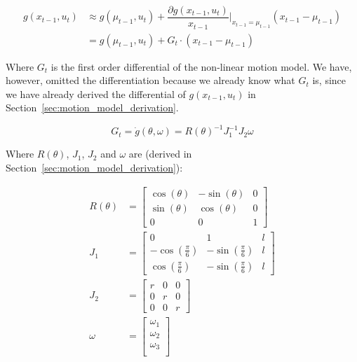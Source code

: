 \documentclass{article}
\begin{document}
\begin{align}
	g(x_{t-1}, u_{t}) 
	& \approx 	
		g(\mu_{t - 1}, u_{t}) 
			+ \dfrac{\partial g(x_{t-1}, u_{t})}{x_{t - 1}} 
				\bigg|_{x_{t - 1} = \mu_{t - 1}}
			(x_{t - 1} - \mu_{t - 1}) \\
	& = g(\mu_{t - 1}, u_{t}) + G_{t} \cdot (x_{t - 1} - \mu_{t - 1})
\end{align}

Where $G_{t}$ is the first order differential of the non-linear motion model. 
We have, however, omitted the differentiation because we already know what 
$G_{t}$ is, since we have already derived the differential of $g(x_{t-1}, 
u_{t})$ in Section~\ref{sec:motion_model_derivation}.

\begin{equation}
	G_{t} = \dot{g}(\theta, \omega) = R(\theta)^{-1} J_{1}^{-1} J_{2} \omega
\end{equation}

Where $R(\theta)$, $J_{1}$, $J_{2}$ and $\omega$ are (derived in 
Section~\ref{sec:motion_model_derivation}): 

\begin{align}
	R(\theta) &= 
 	\begin{bmatrix}
	    \cos{(\theta)} & -\sin{(\theta)} & 0 \\
	    \sin{(\theta)} & \cos{(\theta)} & 0 \\
	    0 & 0 & 1
    \end{bmatrix} \\
	J_{1} &= 
	\begin{bmatrix}
			0 & 1 & l \\
  	    	-\cos(\frac{\pi}{6}) & -\sin(\frac{\pi}{6}) & l \\
   	    	\cos(\frac{\pi}{6}) & -\sin(\frac{\pi}{6}) & l
    \end{bmatrix} \\
    J_{2} &=
    \begin{bmatrix}
        r & 0 & 0 \\
        0 & r & 0 \\
        0 & 0 & r
    \end{bmatrix} \\
    \omega &= 
	    \begin{bmatrix}
	       \omega_{1} \\
	       \omega_{2} \\
	       \omega_{3} \\
	    \end{bmatrix}
\end{align}
\end{document}
